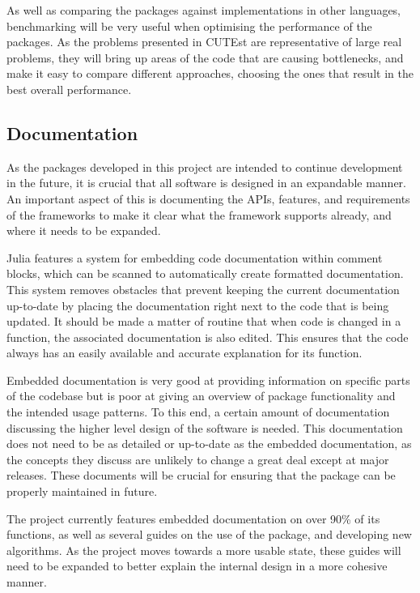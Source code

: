 As well as comparing the packages against implementations in other languages, benchmarking will be very useful when optimising the performance of the packages. As the problems presented in CUTEst are representative of large real problems, they will bring up areas of the code that are causing bottlenecks, and make it easy to compare different approaches, choosing the ones that result in the best overall performance.

\subsection{Documentation}
As the packages developed in this project are intended to continue development in the future, it is crucial that all software is designed in an expandable manner. An important aspect of this is documenting the APIs, features, and requirements of the frameworks to make it clear what the framework supports already, and where it needs to be expanded.

Julia features a system for embedding code documentation within comment blocks, which can be scanned to automatically create formatted documentation. This system removes obstacles that prevent keeping the current documentation up-to-date by placing the documentation right next to the code that is being updated. It should be made a matter of routine that when code is changed in a function, the associated documentation is also edited. This ensures that the code always has an easily available and accurate explanation for its function.

Embedded documentation is very good at providing information on specific parts of the codebase but is poor at giving an overview of package functionality and the intended usage patterns. To this end, a certain amount of documentation discussing the higher level design of the software is needed. This documentation does not need to be as detailed or up-to-date as the embedded documentation, as the concepts they discuss are unlikely to change a great deal except at major releases. These documents will be crucial for ensuring that the package can be properly maintained in future.

The project currently features embedded documentation on over 90\% of its functions, as well as several guides on the use of the package, and developing new algorithms. As the project moves towards a more usable state, these guides will need to be expanded to better explain the internal design in a more cohesive manner.

